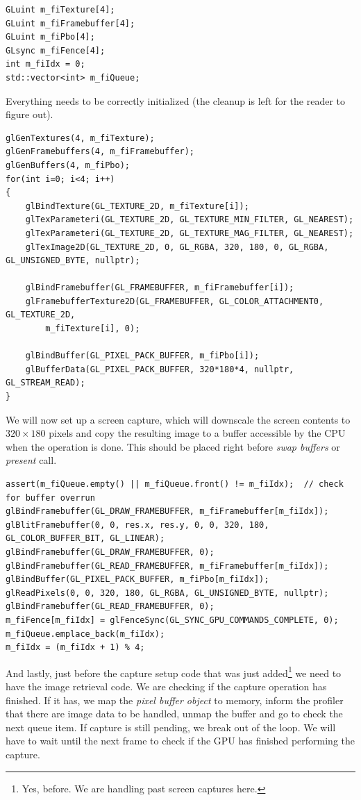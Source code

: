 \documentclass[hidelinks,titlepage,a4paper]{article}
\begin{document}
\begin{lstlisting}
GLuint m_fiTexture[4];
GLuint m_fiFramebuffer[4];
GLuint m_fiPbo[4];
GLsync m_fiFence[4];
int m_fiIdx = 0;
std::vector<int> m_fiQueue;
\end{lstlisting}

Everything needs to be correctly initialized (the cleanup is left for the reader to figure out).

\begin{lstlisting}
glGenTextures(4, m_fiTexture);
glGenFramebuffers(4, m_fiFramebuffer);
glGenBuffers(4, m_fiPbo);
for(int i=0; i<4; i++)
{
    glBindTexture(GL_TEXTURE_2D, m_fiTexture[i]);
    glTexParameteri(GL_TEXTURE_2D, GL_TEXTURE_MIN_FILTER, GL_NEAREST);
    glTexParameteri(GL_TEXTURE_2D, GL_TEXTURE_MAG_FILTER, GL_NEAREST);
    glTexImage2D(GL_TEXTURE_2D, 0, GL_RGBA, 320, 180, 0, GL_RGBA, GL_UNSIGNED_BYTE, nullptr);

    glBindFramebuffer(GL_FRAMEBUFFER, m_fiFramebuffer[i]);
    glFramebufferTexture2D(GL_FRAMEBUFFER, GL_COLOR_ATTACHMENT0, GL_TEXTURE_2D,
		m_fiTexture[i], 0);

    glBindBuffer(GL_PIXEL_PACK_BUFFER, m_fiPbo[i]);
    glBufferData(GL_PIXEL_PACK_BUFFER, 320*180*4, nullptr, GL_STREAM_READ);
}
\end{lstlisting}

We will now set up a screen capture, which will downscale the screen contents to $320\times180$ pixels and copy the resulting image to a buffer accessible by the CPU when the operation is done. This should be placed right before \emph{swap buffers} or \emph{present} call.

\begin{lstlisting}
assert(m_fiQueue.empty() || m_fiQueue.front() != m_fiIdx);	// check for buffer overrun
glBindFramebuffer(GL_DRAW_FRAMEBUFFER, m_fiFramebuffer[m_fiIdx]);
glBlitFramebuffer(0, 0, res.x, res.y, 0, 0, 320, 180, GL_COLOR_BUFFER_BIT, GL_LINEAR);
glBindFramebuffer(GL_DRAW_FRAMEBUFFER, 0);
glBindFramebuffer(GL_READ_FRAMEBUFFER, m_fiFramebuffer[m_fiIdx]);
glBindBuffer(GL_PIXEL_PACK_BUFFER, m_fiPbo[m_fiIdx]);
glReadPixels(0, 0, 320, 180, GL_RGBA, GL_UNSIGNED_BYTE, nullptr);
glBindFramebuffer(GL_READ_FRAMEBUFFER, 0);
m_fiFence[m_fiIdx] = glFenceSync(GL_SYNC_GPU_COMMANDS_COMPLETE, 0);
m_fiQueue.emplace_back(m_fiIdx);
m_fiIdx = (m_fiIdx + 1) % 4;
\end{lstlisting}

And lastly, just before the capture setup code that was just added\footnote{Yes, before. We are handling past screen captures here.} we need to have the image retrieval code. We are checking if the capture operation has finished. If it has, we map the \emph{pixel buffer object} to memory, inform the profiler that there are image data to be handled, unmap the buffer and go to check the next queue item. If capture is still pending, we break out of the loop. We will have to wait until the next frame to check if the GPU has finished performing the capture.
\end{document}
